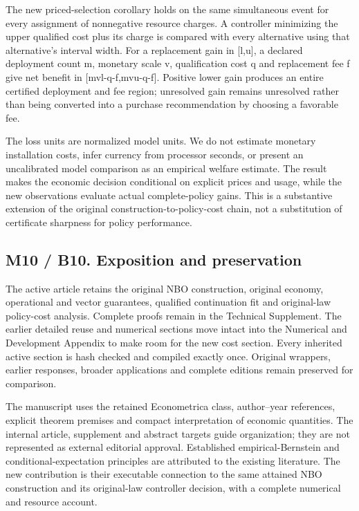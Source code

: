 The new priced-selection corollary holds on the same simultaneous event
for every assignment of nonnegative resource charges. A controller
minimizing the upper qualified cost plus its charge is compared with
every alternative using that alternative's interval width. For a
replacement gain in {[}l,u{]}, a declared deployment count m, monetary
scale v, qualification cost q and replacement fee f give net benefit in
{[}mvl-q-f,mvu-q-f{]}. Positive lower gain produces an entire certified
deployment and fee region; unresolved gain remains unresolved rather
than being converted into a purchase recommendation by choosing a
favorable fee.

The loss units are normalized model units. We do not estimate monetary
installation costs, infer currency from processor seconds, or present an
uncalibrated model comparison as an empirical welfare estimate. The
result makes the economic decision conditional on explicit prices and
usage, while the new observations evaluate actual complete-policy gains.
This is a substantive extension of the original
construction-to-policy-cost chain, not a substitution of certificate
sharpness for policy performance.

\hypertarget{m10-b10.-exposition-and-preservation}{%
\subsection{M10 / B10. Exposition and
preservation}\label{m10-b10.-exposition-and-preservation}}

The active article retains the original NBO construction, original
economy, operational and vector guarantees, qualified continuation fit
and original-law policy-cost analysis. Complete proofs remain in the
Technical Supplement. The earlier detailed reuse and numerical sections
move intact into the Numerical and Development Appendix to make room for
the new cost section. Every inherited active section is hash checked and
compiled exactly once. Original wrappers, earlier responses, broader
applications and complete editions remain preserved for comparison.

The manuscript uses the retained Econometrica class, author--year
references, explicit theorem premises and compact interpretation of
economic quantities. The internal article, supplement and abstract
targets guide organization; they are not represented as external
editorial approval. Established empirical-Bernstein and
conditional-expectation principles are attributed to the existing
literature. The new contribution is their executable connection to the
same attained NBO construction and its original-law controller decision,
with a complete numerical and resource account.

